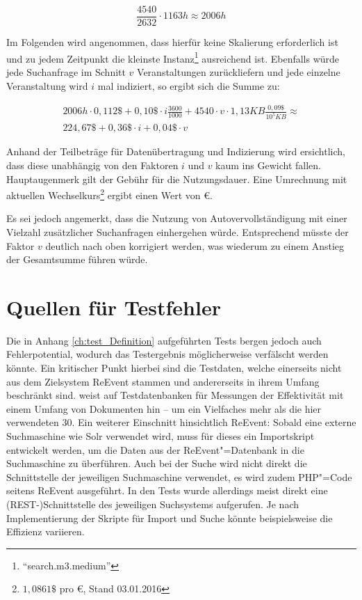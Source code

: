 \begin{equation}
	\frac{4540}{2632} \cdot 1163 h \approx 2006 h
\end{equation}

Im Folgenden wird angenommen, dass hierfür keine Skalierung erforderlich ist und zu jedem Zeitpunkt die kleinste Instanz\footnote{\enquote{search.m3.medium}} ausreichend ist. Ebenfalls würde jede Suchanfrage im Schnitt $v$ Veranstaltungen zurückliefern und jede einzelne Veranstaltung wird $i$ mal indiziert, so ergibt sich die Summe zu:

\begin{align}
	2006h \cdot 0,112 \$ + 0,10 \$ \cdot i \frac{3600}{1000} + 4540 \cdot v \cdot 1,13 KB \frac{0,09 \$}{10^5 KB} \approx \\
	224,67 \$ + 0,36 \$ \cdot i + 0,04 \$ \cdot v
\end{align}

Anhand der Teilbeträge für Datenübertragung und Indizierung wird ersichtlich, dass diese unabhängig von den Faktoren $i$ und $v$ kaum ins Gewicht fallen. Hauptaugenmerk gilt der Gebühr für die Nutzungsdauer. Eine Umrechnung mit aktuellen Wechselkurs\footnote{ $1,0861 \$$ pro €, Stand 03.01.2016 } ergibt einen Wert von  €.

Es sei jedoch angemerkt, dass die Nutzung von Autovervollständigung mit einer Vielzahl zusätzlicher Suchanfragen einhergehen würde. Entsprechend müsste der Faktor $v$ deutlich nach oben korrigiert werden, was wiederum zu einem Anstieg der Gesamtsumme führen würde.

\section{Quellen für Testfehler}

Die in Anhang \ref{ch:test_Definition} aufgeführten Tests bergen jedoch auch Fehlerpotential, wodurch das Testergebnis möglicherweise verfälscht werden könnte. Ein kritischer Punkt hierbei sind die Testdaten, welche einerseits nicht aus dem Zielsystem ReEvent stammen und andererseits in ihrem Umfang beschränkt sind. \cite[S. 443]{Buttcher.2010} weist auf Testdatenbanken für Messungen der Effektivität mit einem Umfang von  Dokumenten hin -- um ein Vielfaches mehr als die hier verwendeten 30. Ein weiterer Einschnitt hinsichtlich ReEvent: Sobald eine externe Suchmaschine wie Solr verwendet wird, muss für dieses ein Importskript entwickelt werden, um die Daten aus der ReEvent"=Datenbank in die Suchmaschine zu überführen. Auch bei der Suche wird nicht direkt die Schnittstelle der jeweiligen Suchmaschine verwendet, es wird zudem PHP"=Code seitens ReEvent ausgeführt. In den Tests wurde allerdings meist direkt eine (REST-)Schnittstelle des jeweiligen Suchsystems aufgerufen. Je nach Implementierung der Skripte für Import und Suche könnte beispielsweise die Effizienz variieren.


